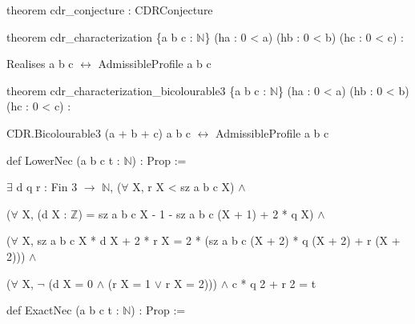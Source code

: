 \documentclass[english,11pt,a4paper]{article}
\begin{document}
\noindent\hspace*{0.0em}\par
\noindent\hspace*{0.0em}theorem cdr\_\allowbreak{}conjecture : CDRConjecture\par
\noindent\hspace*{0.0em}\par
\noindent\hspace*{0.0em}theorem cdr\_\allowbreak{}characterization \{a b c : \(\mathbb N\)\} (ha : 0 < a) (hb : 0 < b) (hc : 0 < c) :\par
\noindent\hspace*{1.8em}Realises a b c \(\leftrightarrow\) AdmissibleProfile a b c\par
\noindent\hspace*{0.0em}\par
\noindent\hspace*{0.0em}theorem cdr\_\allowbreak{}characterization\_\allowbreak{}bicolourable3 \{a b c : \(\mathbb N\)\} (ha : 0 < a) (hb : 0 < b) (hc : 0 < c) :\par
\noindent\hspace*{1.8em}CDR.Bicolourable3 (a + b + c) a b c \(\leftrightarrow\) AdmissibleProfile a b c\par
\noindent\hspace*{0.0em}\par
\noindent\hspace*{0.0em}def LowerNec (a b c t : \(\mathbb N\)) : Prop :=\par
\noindent\hspace*{0.9em}\(\exists\) d q r : Fin 3 \(\to\) \(\mathbb N\), (\(\forall\) X, r X < sz a b c X) \(\land\)\par
\noindent\hspace*{1.8em}(\(\forall\) X, (d X : \(\mathbb Z\)) = sz a b c X - 1 - sz a b c (X + 1) + 2 * q X) \(\land\)\par
\noindent\hspace*{1.8em}(\(\forall\) X, sz a b c X * d X + 2 * r X = 2 * (sz a b c (X + 2) * q (X + 2) + r (X + 2))) \(\land\)\par
\noindent\hspace*{1.8em}(\(\forall\) X, \(\neg\) (d X = 0 \(\land\) (r X = 1 \(\lor\) r X = 2))) \(\land\) c * q 2 + r 2 = t\par
\noindent\hspace*{0.0em}\par
\noindent\hspace*{0.0em}def ExactNec (a b c t : \(\mathbb N\)) : Prop :=\par
\end{document}

